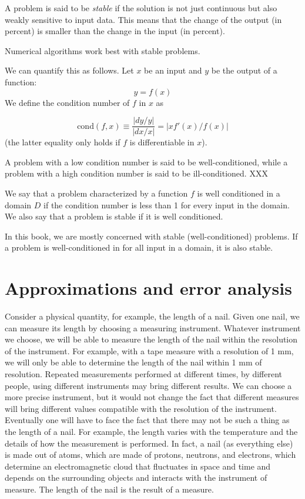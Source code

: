 \documentclass[justified,sixbynine]{tufte-book}
\def\func{\textrm}
\theoremstyle{plain}%
\theoremstyle{definition}
\theoremstyle{remark}
\begin{document}
\begin{fullwidth}
A problem is said to be {\it stable} if the solution is not just continuous but also weakly sensitive to input data. This means that the change of the output (in percent) is smaller than the change in the input (in percent).

Numerical algorithms work best with stable problems.

We can quantify this as follows. Let $x$ be an input and $y$ be the output of a function:
\begin{equation}
y = f(x)
\end{equation}
We define the condition number of $f$ in $x$ as


\begin{equation}
\func{cond}(f,x) \equiv \frac{|dy/y|}{|dx/x|} = |x f'(x)/f(x)|
\end{equation}
(the latter equality only holds if $f$ is differentiable in $x$).

A problem with a low condition number is said to be well-conditioned, while a problem with a high condition number is said to be ill-conditioned. XXX

We say that a problem characterized by a function $f$ is well conditioned in a domain $D$ if the condition number is less than 1 for every input in the domain. We also say that a problem is stable if it is well conditioned.

In this book, we are mostly concerned with stable (well-conditioned) problems. If a problem is well-conditioned in for all input in a domain, it is also stable.


\goodbreak\section{Approximations and error analysis}


Consider a physical quantity, for example, the length of a nail. Given one nail, we can measure its length by choosing a measuring instrument. Whatever instrument we choose, we will be able to measure the length of the nail within the resolution of the instrument. For example, with a tape measure with a resolution of 1 mm, we will only be able to determine the length of the nail within 1 mm of resolution. Repeated measurements performed at different times, by different people, using different instruments may bring different results. We can choose a more precise instrument, but it would not change the fact that different measures will bring different values compatible with the resolution of the instrument. Eventually one will have to face the fact that there may not be such a thing as the length of a nail. For example, the length varies with the temperature and the details of how the measurement is performed. In fact, a nail (as everything else) is made out of atoms, which are made of protons, neutrons, and electrons, which determine an electromagnetic cloud that fluctuates in space and time and depends on the surrounding objects and interacts with the instrument of measure. The length of the nail is the result of a measure.


\end{fullwidth}
\end{document}
